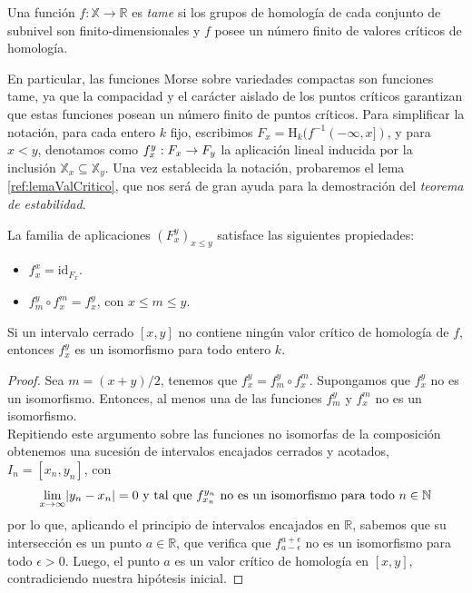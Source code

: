 \begin{definition}
Una función $f: \mathbb{X} \to \mathbb{R}$ es \emph{tame} si los grupos de homología de cada conjunto de subnivel son finito-dimensionales y $f$ posee un número finito de valores críticos de homología.
\end{definition}

\begin{sloppypar}
En particular, las funciones Morse sobre variedades compactas son funciones tame, ya que la compacidad y el carácter aislado de los puntos críticos garantizan que estas funciones posean un número finito de puntos críticos. Para simplificar la notación, para cada entero $k$ fijo, escribimos ${F_x = \text{H}_k(f^{-1}(-\infty, x])}$, y para $x < y$, denotamos como ${\tensor*{f}{*^{y}_{x}}: F_x \to F_y}$ la aplicación lineal inducida por la inclusión $\mathbb{X}_{x} \subseteq \mathbb{X}_{y}$. Una vez establecida la notación, probaremos el lema \ref{ref:lemaValCritico}, que nos será de gran ayuda para la demostración del \emph{teorema de estabilidad}.
\end{sloppypar}

\begin{property}
La familia de aplicaciones $(F_{x}^{y})_{x \leq y}$ satisface las siguientes propiedades:
\begin{itemize}
	\item $f_{x}^{x}= \text{id}_{F_x}$.
	\item $f_{m}^{y} \circ f_{x}^{m} = f_{x}^{y}$, con $x \leq m \leq y$.
\end{itemize}
\end{property}


\begin{lemma}
\label{ref:lemaValCritico}
Si un intervalo cerrado $[x, y]$ no contiene ningún valor crítico de homología de $f$, entonces $f_{x}^{y}$ es un isomorfismo para todo entero $k$.
\end{lemma}

\begin{proof}
Sea $m = (x+y)/2$, tenemos que $f_{x}^{y}=f_{m}^{y} \circ f_{x}^{m}$. Supongamos que $f_{x}^{y}$ no es un isomorfismo. Entonces, al menos una de las funciones $f_{m}^{y}$ y $f_{x}^{m}$ no es un isomorfismo.\\
Repitiendo este argumento sobre las funciones no isomorfas de la composición obtenemos una sucesión de intervalos encajados cerrados y acotados, $I_n=[x_n,y_n]$, con
\[
\lim_{x\to\infty} \lvert y_n - x_n\rvert = 0 \text{ y tal que } f_{x_n}^{y_n} \text{ no es un isomorfismo para todo  } n \in \mathbb{N}
\]
por lo que, aplicando el principio de intervalos encajados en $\mathbb{R}$, sabemos que su intersección es un punto $a \in \mathbb{R}$, que verifica que $f_{a-\epsilon}^{a+\epsilon}$ no es un isomorfismo para todo $\epsilon > 0$. Luego, el punto $a$ es un valor crítico de homología en $[x, y]$, contradiciendo nuestra hipótesis inicial.
\end{proof}

